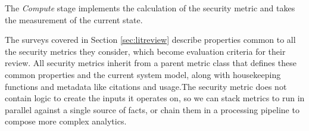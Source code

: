
The \textit{Compute} stage implements the calculation of the security metric and takes the measurement of the current state. 

The surveys covered in Section \ref{sec:litreview} describe properties common to all the security metrics they consider, which become evaluation criteria for their review. All security metrics inherit from a parent metric class that defines these common properties and the current system model, along with housekeeping functions and metadata like citations and usage.The security metric does not contain logic to create the inputs it operates on, so we can stack metrics to run in parallel against a single source of facts, or chain them in a processing pipeline to compose more complex analytics. 

 





